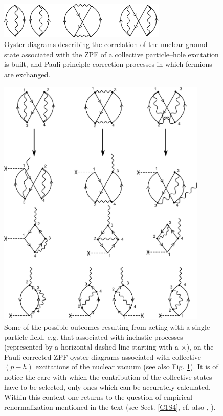 \begin{figure}
\centerline {
\includegraphics*[width=8cm]{introduccion/figs/figintroA1}
}
\caption{Oyster diagrams describing the correlation of the nuclear ground state associated with the ZPF of a collective particle--hole excitation is built, and Pauli principle correction processes in which fermions are exchanged.}
\label{figintroA1}
\end{figure}
\begin{figure}
\centerline {
\includegraphics*[width=10cm]{introduccion/figs/figintroA2}
}
\caption{Some of the possible outcomes resulting from acting with a single--particle field, e.g. that associated with inelastic processes (represented by a horizontal dashed line starting with a $\times$), on the Pauli corrected ZPF oyster diagrams associated with collective $(p-h)$ excitations of the nuclear vacuum (see also Fig. \ref{figintroA1}). It is of notice the care with which the contribution of the collective states have to be selected, only ones which can be accurately calculated. Within this context one returns to the question of empirical renormalization mentioned in the text (see Sect. \ref{C1S4}, cf. also \cite{Idini:15}, \cite{Broglia:16}).}
\label{figintroA2}
\end{figure}
